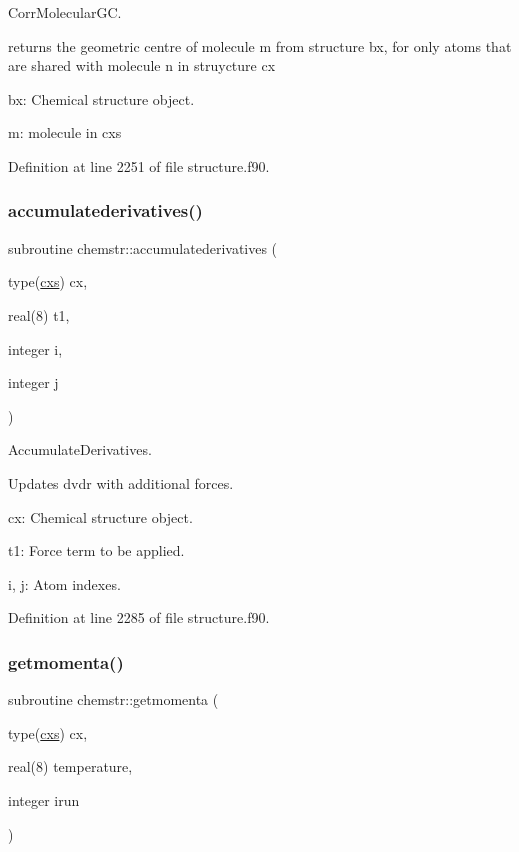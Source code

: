 Corr\+Molecular\+GC. 

returns the geometric centre of molecule m from structure bx, for only atoms that are shared with molecule n in struycture cx


\begin{DoxyItemize}
\item bx\+: Chemical structure object.
\item m\+: molecule in cxs 
\end{DoxyItemize}

Definition at line 2251 of file structure.\+f90.

\mbox{\label{namespacechemstr_aef17d31cdb1cd38fb760b5751f79ca85}} 
\subsubsection{\texorpdfstring{accumulatederivatives()}{accumulatederivatives()}}
{\footnotesize\ttfamily subroutine chemstr\+::accumulatederivatives (\begin{DoxyParamCaption}\item[{type(\mbox{\hyperlink{structchemstr_1_1cxs}{cxs}})}]{cx,  }\item[{real(8)}]{t1,  }\item[{integer}]{i,  }\item[{integer}]{j }\end{DoxyParamCaption})}



Accumulate\+Derivatives. 

Updates dvdr with additional forces.


\begin{DoxyItemize}
\item cx\+: Chemical structure object.
\item t1\+: Force term to be applied.
\item i, j\+: Atom indexes. 
\end{DoxyItemize}

Definition at line 2285 of file structure.\+f90.

\mbox{\label{namespacechemstr_ab195fd63cf5ba3005a33b81ad5a2608a}} 
\subsubsection{\texorpdfstring{getmomenta()}{getmomenta()}}
{\footnotesize\ttfamily subroutine chemstr\+::getmomenta (\begin{DoxyParamCaption}\item[{type(\mbox{\hyperlink{structchemstr_1_1cxs}{cxs}})}]{cx,  }\item[{real(8)}]{temperature,  }\item[{integer}]{irun }\end{DoxyParamCaption})}



